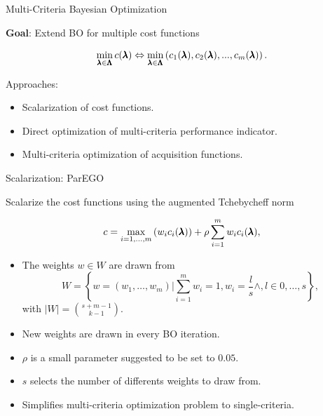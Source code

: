 \begin{frame}{Multi-Criteria Bayesian Optimization}

\textbf{Goal}: Extend BO for multiple cost functions

$$
\min_{\pmb{\lambda} \in \pmb{\Lambda}}  c(\pmb{\lambda}) \Leftrightarrow \min_{\pmb{\lambda} \in \pmb{\Lambda}} \left(c_1(\pmb{\lambda}), c_2(\pmb{\lambda}), ..., c_m(\pmb{\lambda})\right).
$$

Approaches:

\begin{itemize}
        \item Scalarization of cost functions.
        \item Direct optimization of multi-criteria performance indicator.
        \item Multi-criteria optimization of acquisition functions.
\end{itemize}


\end{frame}

\begin{frame}{Scalarization: ParEGO}

    Scalarize the cost functions using the augmented Tchebycheff norm

    $$
    c = \max_{i=1,\dots,m}\left(w_i c_i(\pmb{\lambda})\right) + \rho \sum_{i=1}^m w_ic_i(\pmb{\lambda}),
    $$

    \begin{itemize}
        \item The weights $w \in W$ are drawn from
            $$
                W = \left\{ w = (w_1, \dots, w_m) | \sum_{i=1}^m w_i = 1, w_i = \frac{l}{s} \wedge, l \in 0,\dots,s\right\},
            $$
            with $|W| = {{s+m-1}\choose{k-1}}$.
        \item New weights are drawn in every BO iteration.
        \item $\rho$ is a small parameter suggested to be set to $0.05$.
        \item $s$ selects the number of differents weights to draw from.
        \item Simplifies multi-criteria optimization problem to single-criteria.
    \end{itemize}


\end{frame}


